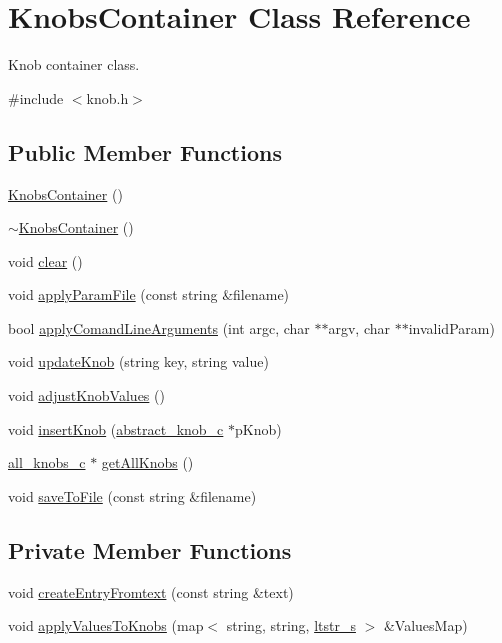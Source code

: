 \hypertarget{classKnobsContainer}{
\section{KnobsContainer Class Reference}
\label{classKnobsContainer}
}


Knob container class.  




{\ttfamily \#include $<$knob.h$>$}

\subsection*{Public Member Functions}
\begin{DoxyCompactItemize}
\item 
\hyperlink{classKnobsContainer_a637e76f93ef35fb3010f70716370122c}{KnobsContainer} ()
\item 
\hyperlink{classKnobsContainer_a740c2bd5585b3e8ff79d53abe552e599}{$\sim$KnobsContainer} ()
\item 
void \hyperlink{classKnobsContainer_a7cc9643a085c659b4cc87772eb5cede5}{clear} ()
\item 
void \hyperlink{classKnobsContainer_a6f6d4e149552f3e5b88f63c0c0a646ea}{applyParamFile} (const string \&filename)
\item 
bool \hyperlink{classKnobsContainer_afa7b97256d716e80c095083c8e7f29ec}{applyComandLineArguments} (int argc, char $\ast$$\ast$argv, char $\ast$$\ast$invalidParam)
\item 
void \hyperlink{classKnobsContainer_a706481af8bf1aa7a6dff4008fb3b32dd}{updateKnob} (string key, string value)
\item 
void \hyperlink{classKnobsContainer_a7702987d669e6c8b664f072925c9fdff}{adjustKnobValues} ()
\item 
void \hyperlink{classKnobsContainer_ab042a2ec72a140dfe2c1e54b0199b52f}{insertKnob} (\hyperlink{classabstract__knob__c}{abstract\_\-knob\_\-c} $\ast$pKnob)
\item 
\hyperlink{classall__knobs__c}{all\_\-knobs\_\-c} $\ast$ \hyperlink{classKnobsContainer_ac0efc90a0f385d18b51dee85d208c0d3}{getAllKnobs} ()
\item 
void \hyperlink{classKnobsContainer_aa954305dc34f4e976a951287411543b5}{saveToFile} (const string \&filename)
\end{DoxyCompactItemize}
\subsection*{Private Member Functions}
\begin{DoxyCompactItemize}
\item 
void \hyperlink{classKnobsContainer_a1abd33be5ccd66c0fc7b1abdd4f8493d}{createEntryFromtext} (const string \&text)
\item 
void \hyperlink{classKnobsContainer_ac8c849dc40caa4ead07a74b416700e0f}{applyValuesToKnobs} (map$<$ string, string, \hyperlink{structltstr__s}{ltstr\_\-s} $>$ \&ValuesMap)
\end{DoxyCompactItemize}
